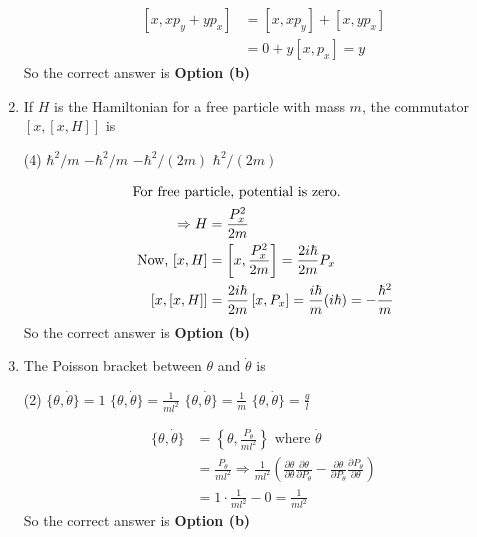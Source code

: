 \begin{enumerate}
\begin{answer}
	\begin{align*}
	\left[x, x p_{y}+y p_{x}\right]&=\left[x, x p_{y}\right]+\left[x, y p_{x}\right]\\&=0+y\left[x, p_{x}\right]=y
	\end{align*}
	So the correct answer is \textbf{Option (b)}
\end{answer}
	\item  If $H$ is the Hamiltonian for a free particle with mass $m$, the commutator $[x,[x, H]]$ is
	{}
	\begin{tasks}(4)
		\task[\textbf{a.}]$\hbar^{2} / m$
		\task[\textbf{b.}]$-\hbar^{2} / m$
		\task[\textbf{c.}]$-\hbar^{2} /(2 m)$
		\task[\textbf{d.}] $\hbar^{2} /(2 m)$
	\end{tasks}
\begin{answer}
	\begin{align*}
	\intertext{For free particle, potential is zero.}
	\Rightarrow H&=\frac{P_{x}^{2}}{2 m}\\
	\text{	Now, }[x, H]&=\left[x, \frac{P_{x}^{2}}{2 m}\right]=\frac{2 i \hbar}{2 m} P_{x}\\
	[x,[x, H]]&=\frac{2 i \hbar}{2 m}\left[x, P_{x}\right]=\frac{i \hbar}{m}(i \hbar)=-\frac{\hbar^{2}}{m}
	\end{align*}
	So the correct answer is \textbf{Option (b)}
\end{answer}
	\item  The Poisson bracket between $\theta$ and $\dot{\theta}$ is
	{}
	\begin{tasks}(2)
		\task[\textbf{a.}]$\{\theta, \dot{\theta}\}=1$
		\task[\textbf{b.}] $\{\theta, \dot{\theta}\}=\frac{1}{m l^{2}}$
		\task[\textbf{c.}]$\{\theta, \dot{\theta}\}=\frac{1}{m}$
		\task[\textbf{d.}] $\{\theta, \dot{\theta}\}=\frac{g}{l}$
	\end{tasks}
\begin{answer}
	\begin{align*}
	\{\theta, \dot{\theta}\}&=\left\{\theta, \frac{P_{\theta}}{m l^{2}}\right\}\text{ where } \dot{\theta}\\&=\frac{P_{\theta}}{m l^{2}} \Rightarrow \frac{1}{m l^{2}}\left(\frac{\partial \theta}{\partial \theta} \frac{\partial \theta}{\partial P_{\theta}}-\frac{\partial \theta}{\partial P_{\theta}} \frac{\partial P_{\theta}}{\partial \theta}\right)\\&=1 \cdot \frac{1}{m l^{2}}-0=\frac{1}{m l^{2}}
	\end{align*}
	So the correct answer is \textbf{Option (b)}

\end{answer}
\end{enumerate}
